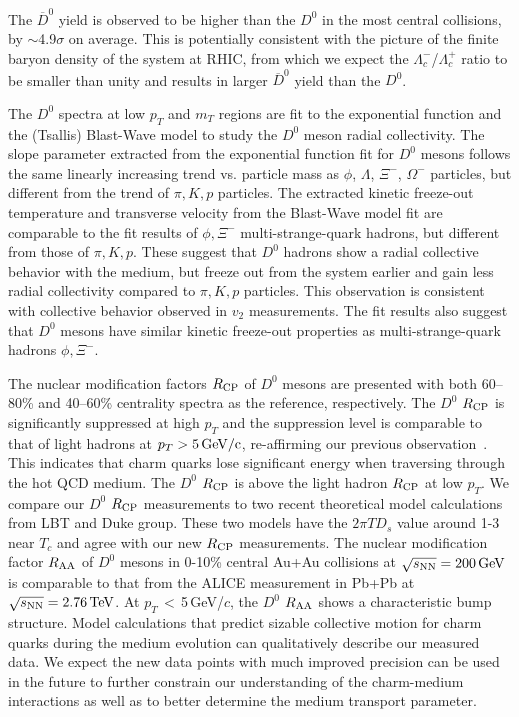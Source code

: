 \documentclass[%
 reprint,	
 amsmath,amssymb,
 aps,
 prc,
]{revtex4-1}
\begin{document}
The $\overline{D}^{0}$ yield is observed to be higher than the $D^0$ in the most central collisions, by $\sim$4.9$\sigma$ on average. This is potentially consistent with the picture of the finite baryon density of the system at RHIC, from which we expect the $\Lambda_{c}^-$/$\Lambda_{c}^+$ ratio to be smaller than unity and results in larger $\overline{D}^{0}$ yield than the $D^0$.

The $D^0$ spectra at low $p_{T}$ and $m_{T}$ regions are fit to the exponential function and the (Tsallis) Blast-Wave model to study the $D^0$ meson radial collectivity. The slope parameter extracted from the exponential function fit for $D^0$ mesons follows the same linearly increasing trend vs. particle mass as $\phi$, $\Lambda$, $\Xi^-$, $\Omega^-$ particles, but different from the trend of $\pi,K,p$ particles. The extracted kinetic freeze-out temperature and transverse velocity from the Blast-Wave model fit are comparable to the fit results of $\phi,\Xi^-$ multi-strange-quark hadrons, but different from those of $\pi,K,p$. These suggest that $D^0$ hadrons show a radial collective behavior with the medium, but freeze out from the system earlier and gain less radial collectivity compared to $\pi,K,p$ particles. This observation is consistent with collective behavior observed in $v_2$ measurements. The fit results also suggest that $D^0$ mesons have similar kinetic freeze-out properties as multi-strange-quark hadrons $\phi,\Xi^-$.

The nuclear modification factors $R_{\rm CP}$ of $D^0$ mesons are presented with both 60--80\% and 40--60\% centrality spectra as the reference, respectively. The $D^0$ $R_{\rm CP}$ is significantly suppressed at high $p_{T}$ and the suppression level is comparable to that of light hadrons at $p_{T}> 5\,\rm{GeV}/c$, re-affirming our previous observation~\cite{Star_D_RAA}. This indicates that charm quarks lose significant energy when traversing through the hot QCD medium. The $D^0$ $R_{\rm CP}$ is above the light hadron $R_{\rm CP}$ at low $p_{T}$. We compare our $D^0$ $R_{\rm CP}$ measurements to two recent theoretical model calculations from LBT and Duke group. These two models have the $2\pi TD_s$ value around 1-3 near $T_{c}$ and agree with our new $R_{\rm CP}$ measurements. The nuclear modification factor $R_{\rm AA}$ of $D^0$ mesons in 0-10\% central Au+Au collisions at ${\sqrt{s_{\rm NN}} = \rm{200\,GeV}}$ is comparable to that from the ALICE measurement in Pb+Pb at ${\sqrt{s_{\rm NN}} = \rm{2.76\,TeV}}$. At $p_{T}$\,$<$\,5\,GeV/$c$, the $D^0$ $R_{\rm AA}$ shows a characteristic bump structure. Model calculations that predict sizable collective motion for charm quarks during the medium evolution can qualitatively describe our measured data. We expect the new data points with much improved precision can be used in the future to further constrain our understanding of the charm-medium interactions as well as to better determine the medium transport parameter.
\end{document}
